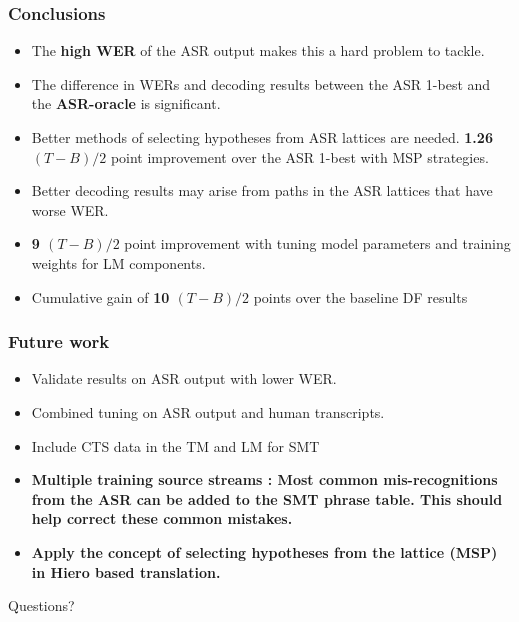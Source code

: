 \documentclass{beamer}
\begin{document}
\begin{frame}
\frametitle{Conclusions}
\begin{itemize}
\item The \textbf{high WER} of the ASR output makes this a hard problem to tackle.
\item The difference in WERs and decoding results between the ASR 1-best and the \textbf{ASR-oracle} is significant.
\item Better methods of selecting hypotheses from ASR lattices are needed. \textbf{1.26 $(T-B)/2$} point improvement over the ASR 1-best with MSP strategies.
\item Better decoding results may arise from paths in the ASR lattices that have worse WER. 
\item \textbf{9 $(T-B)/2$} point improvement with tuning model parameters and training weights for LM components.
\item Cumulative gain of \textbf{10 $(T-B)/2$} points over the baseline DF results
\end{itemize}
\end{frame}

\begin{frame}
\frametitle{Future work}
\begin{itemize}
\item Validate results on ASR output with lower WER.
\item Combined tuning on ASR output and human transcripts.
\item Include CTS data in the TM and LM for SMT
\item \textbf{Multiple training source streams : Most common mis-recognitions from the ASR can be added to the SMT phrase table. This should help correct these common mistakes.}
\item \textbf{Apply the concept of selecting hypotheses from the lattice (MSP) in Hiero based translation.}
\end{itemize}
\end{frame}

\begin{frame}
\Huge{\centerline{Questions?}}
\end{frame}

\end{document}

